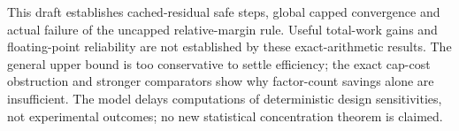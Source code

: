 \documentclass[11pt]{article}
\begin{document}
This draft establishes cached-residual safe steps, global capped convergence and actual failure of the uncapped relative-margin rule. Useful total-work gains and floating-point reliability are not established by these exact-arithmetic results. The general upper bound is too conservative to settle efficiency; the exact cap-cost obstruction and stronger comparators show why factor-count savings alone are insufficient. The model delays computations of deterministic design sensitivities, not experimental outcomes; no new statistical concentration theorem is claimed.

\clearpage

\end{document}
